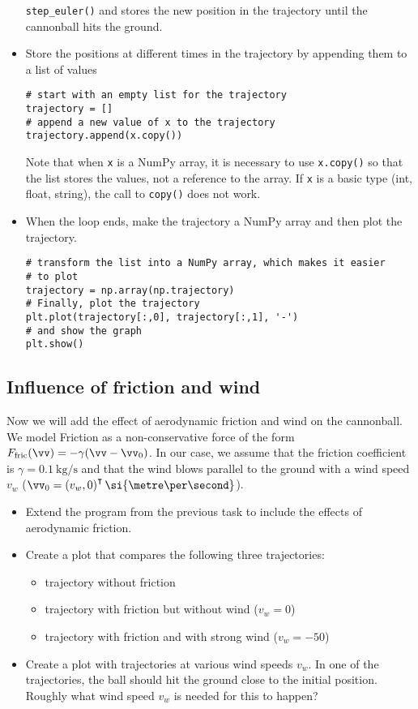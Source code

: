 \begin{itemize}
    \lstinline!step_euler()! and stores the new position in the trajectory
    until the cannonball hits the ground.
  \item Store the positions at different times in the trajectory by appending
    them to a list of values
    \begin{lstlisting}
# start with an empty list for the trajectory
trajectory = []
# append a new value of x to the trajectory
trajectory.append(x.copy())
    \end{lstlisting}
    Note that when \lstinline!x! is a NumPy array, it is necessary to use
    \lstinline!x.copy()! so that the list stores the values, not a reference to
    the array.
    If \lstinline!x! is a basic type (int, float, string), the call to
    \lstinline!copy()! does not work.
  \item When the loop ends, make the trajectory a NumPy array and then plot the
    trajectory.
    \begin{lstlisting}
# transform the list into a NumPy array, which makes it easier 
# to plot
trajectory = np.array(np.trajectory)
# Finally, plot the trajectory
plt.plot(trajectory[:,0], trajectory[:,1], '-')
# and show the graph
plt.show()
    \end{lstlisting}
\end{itemize}

\subsection{Influence of friction and wind}

Now we will add the effect of aerodynamic friction and wind on the cannonball.
We model Friction as a non-conservative force of the form $F_{\mathrm{fric}}(\vv) =
-\gamma (\vv-\vv_0)$. 
In our case, we assume that the friction coefficient is $\gamma = \SI{0.1}{\kilogram\per\second}$ and that
the wind blows parallel to the ground with a wind speed $v_w$ ($\vv_0 =
\left(v_w, 0\right)^\intercal \si{\metre\per\second}$).

\begin{task}[3]
  \begin{itemize}
  \item Extend the program from the previous task to include the effects of
    aerodynamic friction.
  \item Create a plot that compares the following three trajectories:
    \begin{itemize}
      \item trajectory without friction
      \item trajectory with friction but without wind ($v_w=0$)
      \item trajectory with friction and with strong wind ($v_w=-50$)
    \end{itemize}
  \item Create a plot with trajectories at various wind speeds $v_w$.
    In one of the trajectories, the ball should hit the ground close to
    the initial position. Roughly what wind speed $v_w$ is needed for
    this to happen?
  \end{itemize}
\end{task}

